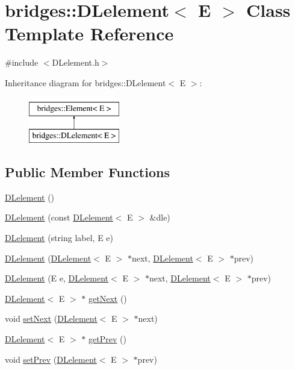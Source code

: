 \hypertarget{classbridges_1_1_d_lelement}{}\section{bridges\+:\+:D\+Lelement$<$ E $>$ Class Template Reference}
\label{classbridges_1_1_d_lelement}


{\ttfamily \#include $<$D\+Lelement.\+h$>$}

Inheritance diagram for bridges\+:\+:D\+Lelement$<$ E $>$\+:\begin{figure}[H]
\begin{center}
\leavevmode
\includegraphics[height=2.000000cm]{classbridges_1_1_d_lelement}
\end{center}
\end{figure}
\subsection*{Public Member Functions}
\begin{DoxyCompactItemize}
\item 
\hyperlink{classbridges_1_1_d_lelement_a79e05d2d74eab75a987531250037b40b}{D\+Lelement} ()
\item 
\hyperlink{classbridges_1_1_d_lelement_af2e5ada14a837f8e01001531ec1c76a7}{D\+Lelement} (const \hyperlink{classbridges_1_1_d_lelement}{D\+Lelement}$<$ E $>$ \&dle)
\item 
\hyperlink{classbridges_1_1_d_lelement_a1897fad94722f833241e7a665fe57124}{D\+Lelement} (string label, E e)
\item 
\hyperlink{classbridges_1_1_d_lelement_a07dabe0accc1bbdd4063a566b1f02f94}{D\+Lelement} (\hyperlink{classbridges_1_1_d_lelement}{D\+Lelement}$<$ E $>$ $\ast$next, \hyperlink{classbridges_1_1_d_lelement}{D\+Lelement}$<$ E $>$ $\ast$prev)
\item 
\hyperlink{classbridges_1_1_d_lelement_a5fd70407e3539971d76d8b204e775f9f}{D\+Lelement} (E e, \hyperlink{classbridges_1_1_d_lelement}{D\+Lelement}$<$ E $>$ $\ast$next, \hyperlink{classbridges_1_1_d_lelement}{D\+Lelement}$<$ E $>$ $\ast$prev)
\item 
\hyperlink{classbridges_1_1_d_lelement}{D\+Lelement}$<$ E $>$ $\ast$ \hyperlink{classbridges_1_1_d_lelement_a0f638cca77375d6bdc2ff8a23700568c}{get\+Next} ()
\item 
void \hyperlink{classbridges_1_1_d_lelement_a12db627afdb6e0c56ead5f46a3d41036}{set\+Next} (\hyperlink{classbridges_1_1_d_lelement}{D\+Lelement}$<$ E $>$ $\ast$next)
\item 
\hyperlink{classbridges_1_1_d_lelement}{D\+Lelement}$<$ E $>$ $\ast$ \hyperlink{classbridges_1_1_d_lelement_aa3093474809715575f4c5145d71e6db9}{get\+Prev} ()
\item 
void \hyperlink{classbridges_1_1_d_lelement_adcf1c913e922a15724e8cd86c21c5730}{set\+Prev} (\hyperlink{classbridges_1_1_d_lelement}{D\+Lelement}$<$ E $>$ $\ast$prev)
\end{DoxyCompactItemize}


